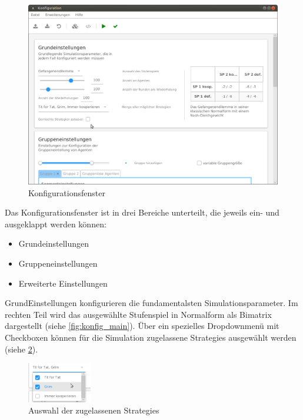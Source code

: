 \documentclass[parskip=full,11pt]{scrartcl}
\begin{document}
\begin{figure}[ht]
	\centering
	\includegraphics[width=\textwidth]{images/konfig.png}
	\caption{\label{fig:konfig}
		Konfigurationsfenster}
\end{figure}

Das Konfigurationsfenster ist in drei Bereiche unterteilt, die jeweils ein- und ausgeklappt werden können:
\begin{itemize} \itemsep -10pt
	\item Grundeinstellungen
	\item Gruppeneinstellungen
	\item Erweiterte Einstellungen
\end{itemize}

GrundEinstellungen konfigurieren die fundamentalsten Simulationsparameter. Im rechten Teil wird das ausgewählte \Gls{Stufenspiel} in Normalform als \Gls{Bimatrix} dargestellt (siehe \cref{fig:konfig_main}). Über ein spezielles Dropdownmenü mit Checkboxen können für die Simulation zugelassene \Glspl{Strategie} ausgewählt werden (siehe \cref{fig:konfig_strat_detail}).

\begin{figure}[ht]
	\centering
	\includegraphics[width=0.25\textwidth]{images/konfig_strat_detail.png}
	\caption{\label{fig:konfig_strat_detail}
		Auswahl der zugelassenen \Glspl{Strategie}}
\end{figure}
\end{document}
